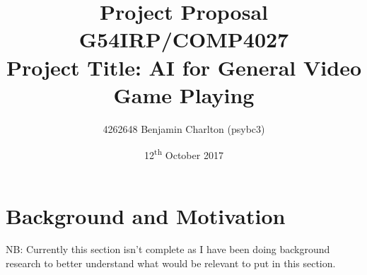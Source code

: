 \documentclass[a4paper]{article}
\begin{document}
\title{
    Project Proposal
    \\ \large{G54IRP/COMP4027}
    \\ \large{Project Title: AI for General Video Game Playing}\vspace{-3ex}}
\author{4262648 Benjamin Charlton (psybc3)}
\date{\vspace{-2ex}12\textsuperscript{th} October 2017}
\maketitle

\section{Background and Motivation}
NB:  Currently this section isn't complete as I have been doing background research to better understand what would be relevant to put in this section.
\par
\pagebreak
\end{document}
